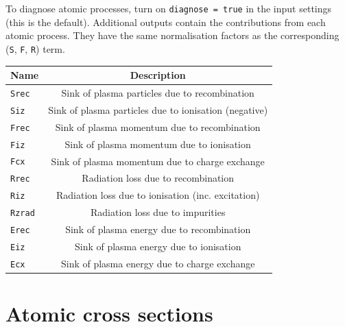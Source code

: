 \documentclass[12pt,a4paper]{article}
\begin{document}
\noindent To diagnose atomic processes, turn on \texttt{diagnose = true} in the input settings (this is the default).
Additional outputs contain the contributions from each atomic process. They have the same normalisation
factors as the corresponding (\texttt{S}, \texttt{F}, \texttt{R}) term.
\begin{center}
\begin{tabular}{l c}
  Name & Description\\
  \hline
  \texttt{Srec} & Sink of plasma particles due to recombination \\
  \texttt{Siz}  & Sink of plasma particles due to ionisation (negative) \\
  \texttt{Frec} & Sink of plasma momentum due to recombination \\
  \texttt{Fiz}  & Sink of plasma momentum due to ionisation \\
  \texttt{Fcx}  & Sink of plasma momentum due to charge exchange \\
  \texttt{Rrec} & Radiation loss due to recombination \\
  \texttt{Riz}  & Radiation loss due to ionisation (inc. excitation) \\
  \texttt{Rzrad} & Radiation loss due to impurities \\
  \texttt{Erec} & Sink of plasma energy due to recombination \\
  \texttt{Eiz}  & Sink of plasma energy due to ionisation \\
  \texttt{Ecx}  & Sink of plasma energy due to charge exchange \\
  \hline
\end{tabular}
\end{center}

\section{Atomic cross sections}
\end{document}
